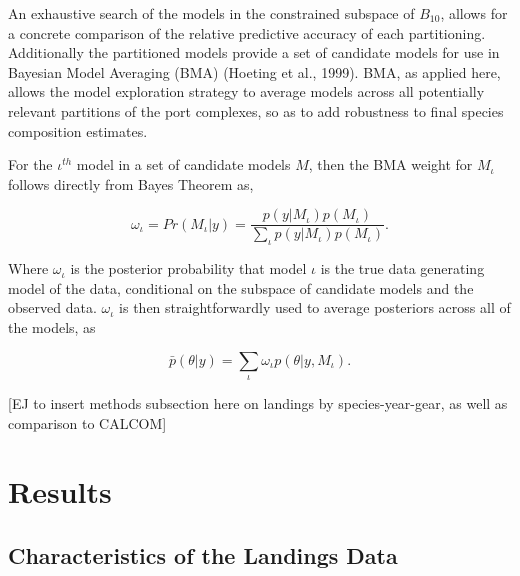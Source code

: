 \documentclass[12pt]{article}
\begin{document}
An exhaustive search of the models in the constrained subspace of
\(B_{10}\), allows for a concrete comparison of the relative predictive
accuracy of each partitioning. Additionally the partitioned models
provide a set of candidate models for use in Bayesian Model Averaging
(BMA) (Hoeting et al., 1999). BMA, as applied here, allows the model
exploration strategy to average models across all potentially relevant
partitions of the port complexes, so as to add robustness to final
species composition estimates.

For the \(\iota^{th}\) model in a set of candidate models \(M\), then
the BMA weight for \(M_\iota\) follows directly from Bayes Theorem as,

\[\omega_\iota = Pr(M_\iota|y) = \frac{ p(y|M_\iota)p(M_\iota) }{ \sum_\iota p(y|M_\iota)p(M_\iota) }.\]

Where \(\omega_\iota\) is the posterior probability that model \(\iota\)
is the true data generating model of the data, conditional on the
subspace of candidate models and the observed data. \(\omega_\iota\) is
then straightforwardly used to average posteriors across all of the
models, as

\[\bar p(\theta|y) = \sum_{\iota} \omega_\iota p(\theta|y, M_\iota).\]

[EJ to insert methods subsection here on landings by species-year-gear, as 
well as comparison to CALCOM]

%
%
\section{Results}\label{results}
%
%

\subsection{Characteristics of the Landings Data}\label{landData}
\end{document}

